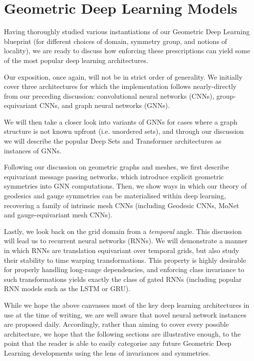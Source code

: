\section{Geometric Deep Learning Models}

Having thoroughly studied various instantiations of our Geometric Deep Learning blueprint (for different choices of domain, symmetry group, and notions of locality), we are ready to discuss how enforcing these prescriptions can yield some of the most popular deep learning architectures.

Our exposition, once again, will not be in strict order of generality. We initially cover three architectures for which the implementation follows nearly-directly from our preceding discussion: convolutional neural networks (CNNs), group-equivariant CNNs, and graph neural networks (GNNs).

We will then take a closer look into variants of GNNs for cases where a graph structure is not known upfront (i.e. unordered sets), and through our discussion we will describe the popular Deep Sets and Transformer architectures as instances of GNNs.

Following our discussion on geometric graphs and meshes, we first describe equivariant message passing networks, which introduce explicit geometric symmetries into GNN computations. Then, we show ways in which our theory of geodesics and gauge symmetries can be materialised within deep learning, recovering a family of intrinsic mesh CNNs (including Geodesic CNNs, MoNet and gauge-equivariant mesh CNNs).

Lastly, we look back on the grid domain from a \emph{temporal} angle. This discussion will lead us to recurrent neural networks (RNNs). We will demonstrate a manner in which RNNs are translation equivariant over temporal grids, but also study their stability to time warping transformations. This property is highly desirable for properly handling long-range dependencies, and enforcing class invariance to such transformations yields exactly the class of gated RNNs (including popular RNN models such as the LSTM or GRU). %

While we hope the above canvasses most of the key deep learning architectures in use at the time of writing, we are well aware that novel neural network instances are proposed daily. Accordingly, rather than aiming to cover every possible architecture, we hope that the following sections are illustrative enough, to the point that the reader is able to easily categorise any future Geometric Deep Learning developments using the lens of invariances and symmetries.

